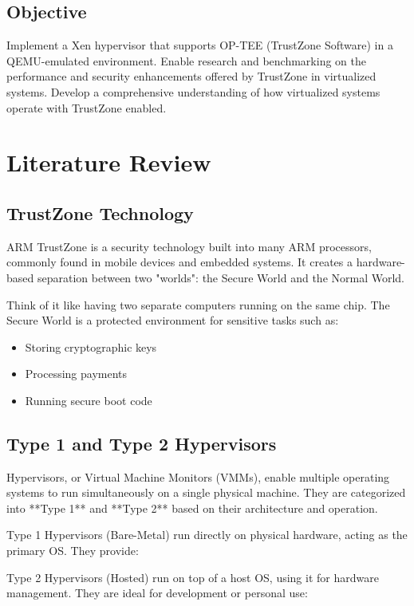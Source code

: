 \documentclass[acmtog]{acmart}
\begin{document}
\subsection{Objective}
Implement a Xen hypervisor that supports OP-TEE (TrustZone Software) in a QEMU-emulated environment.
Enable research and benchmarking on the performance and security enhancements offered by TrustZone in virtualized systems.
Develop a comprehensive understanding of how virtualized systems operate with TrustZone enabled.


\section{Literature Review}
\subsection{TrustZone Technology}
ARM TrustZone is a security technology built into many ARM processors, commonly found in mobile devices and embedded systems. It creates a hardware-based separation between two "worlds": the Secure World and the Normal World.

Think of it like having two separate computers running on the same chip. The Secure World is a protected environment for sensitive tasks such as:
\begin{itemize}
  \item  Storing cryptographic keys
  \item Processing payments
  \item Running secure boot code
\end{itemize}


\subsection{Type 1 and Type 2 Hypervisors}  
Hypervisors, or Virtual Machine Monitors (VMMs), enable multiple operating systems to run simultaneously on a single physical machine. They are categorized into **Type 1** and **Type 2** based on their architecture and operation.

Type 1 Hypervisors (Bare-Metal) run directly on physical hardware, acting as the primary OS. They provide:  

Type 2 Hypervisors (Hosted) run on top of a host OS, using it for hardware management. They are ideal for development or personal use:  
 
\end{document}
